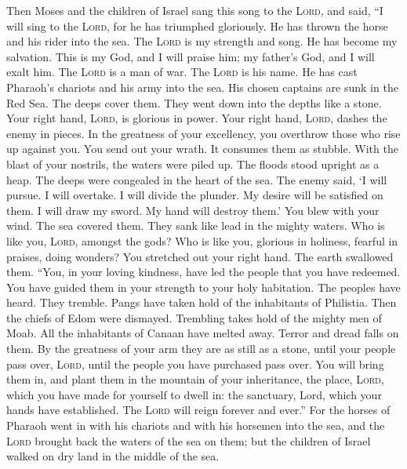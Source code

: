  Then Moses and the children of Israel sang this song to
the \textsc{Lord}, and said, ``I will sing to the \textsc{Lord}, for he
has triumphed gloriously. He has thrown the horse and his rider into the
sea.  The \textsc{Lord} is my strength and song. He has
become my salvation. This is my God, and I will praise him; my father's
God, and I will exalt him.  The \textsc{Lord} is a man of
war. The \textsc{Lord} is his name.  He has cast Pharaoh's
chariots and his army into the sea. His chosen captains are sunk in the
Red Sea.  The deeps cover them. They went down into the
depths like a stone.  Your right hand, \textsc{Lord}, is
glorious in power. Your right hand, \textsc{Lord}, dashes the enemy in
pieces.  In the greatness of your excellency, you
overthrow those who rise up against you. You send out your wrath. It
consumes them as stubble.  With the blast of your
nostrils, the waters were piled up. The floods stood upright as a heap.
The deeps were congealed in the heart of the sea.  The
enemy said, `I will pursue. I will overtake. I will divide the plunder.
My desire will be satisfied on them. I will draw my sword. My hand will
destroy them.'  You blew with your wind. The sea covered
them. They sank like lead in the mighty waters.  Who is
like you, \textsc{Lord}, amongst the gods? Who is like you, glorious in
holiness, fearful in praises, doing wonders?  You
stretched out your right hand. The earth swallowed them. 
``You, in your loving kindness, have led the people that you have
redeemed. You have guided them in your strength to your holy habitation.
 The peoples have heard. They tremble. Pangs have taken
hold of the inhabitants of Philistia.  Then the chiefs of
Edom were dismayed. Trembling takes hold of the mighty men of Moab. All
the inhabitants of Canaan have melted away.  Terror and
dread falls on them. By the greatness of your arm they are as still as a
stone, until your people pass over, \textsc{Lord}, until the people you
have purchased pass over.  You will bring them in, and
plant them in the mountain of your inheritance, the place,
\textsc{Lord}, which you have made for yourself to dwell in: the
sanctuary, Lord, which your hands have established.  The
\textsc{Lord} will reign forever and ever.''  For the
horses of Pharaoh went in with his chariots and with his horsemen into
the sea, and the \textsc{Lord} brought back the waters of the sea on
them; but the children of Israel walked on dry land in the middle of the
sea.

